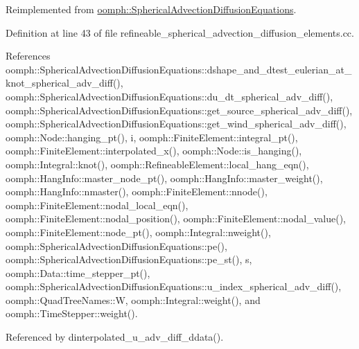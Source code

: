 Reimplemented from \hyperlink{classoomph_1_1SphericalAdvectionDiffusionEquations_ad97d019b2b4715d379adca3320262d29}{oomph\+::\+Spherical\+Advection\+Diffusion\+Equations}.



Definition at line 43 of file refineable\+\_\+spherical\+\_\+advection\+\_\+diffusion\+\_\+elements.\+cc.



References oomph\+::\+Spherical\+Advection\+Diffusion\+Equations\+::dshape\+\_\+and\+\_\+dtest\+\_\+eulerian\+\_\+at\+\_\+knot\+\_\+spherical\+\_\+adv\+\_\+diff(), oomph\+::\+Spherical\+Advection\+Diffusion\+Equations\+::du\+\_\+dt\+\_\+spherical\+\_\+adv\+\_\+diff(), oomph\+::\+Spherical\+Advection\+Diffusion\+Equations\+::get\+\_\+source\+\_\+spherical\+\_\+adv\+\_\+diff(), oomph\+::\+Spherical\+Advection\+Diffusion\+Equations\+::get\+\_\+wind\+\_\+spherical\+\_\+adv\+\_\+diff(), oomph\+::\+Node\+::hanging\+\_\+pt(), i, oomph\+::\+Finite\+Element\+::integral\+\_\+pt(), oomph\+::\+Finite\+Element\+::interpolated\+\_\+x(), oomph\+::\+Node\+::is\+\_\+hanging(), oomph\+::\+Integral\+::knot(), oomph\+::\+Refineable\+Element\+::local\+\_\+hang\+\_\+eqn(), oomph\+::\+Hang\+Info\+::master\+\_\+node\+\_\+pt(), oomph\+::\+Hang\+Info\+::master\+\_\+weight(), oomph\+::\+Hang\+Info\+::nmaster(), oomph\+::\+Finite\+Element\+::nnode(), oomph\+::\+Finite\+Element\+::nodal\+\_\+local\+\_\+eqn(), oomph\+::\+Finite\+Element\+::nodal\+\_\+position(), oomph\+::\+Finite\+Element\+::nodal\+\_\+value(), oomph\+::\+Finite\+Element\+::node\+\_\+pt(), oomph\+::\+Integral\+::nweight(), oomph\+::\+Spherical\+Advection\+Diffusion\+Equations\+::pe(), oomph\+::\+Spherical\+Advection\+Diffusion\+Equations\+::pe\+\_\+st(), s, oomph\+::\+Data\+::time\+\_\+stepper\+\_\+pt(), oomph\+::\+Spherical\+Advection\+Diffusion\+Equations\+::u\+\_\+index\+\_\+spherical\+\_\+adv\+\_\+diff(), oomph\+::\+Quad\+Tree\+Names\+::W, oomph\+::\+Integral\+::weight(), and oomph\+::\+Time\+Stepper\+::weight().



Referenced by dinterpolated\+\_\+u\+\_\+adv\+\_\+diff\+\_\+ddata().

\mbox{\label{classoomph_1_1RefineableSphericalAdvectionDiffusionEquations_a77053e6352f6cc7a3c550d7bc4ee8b39}} 
